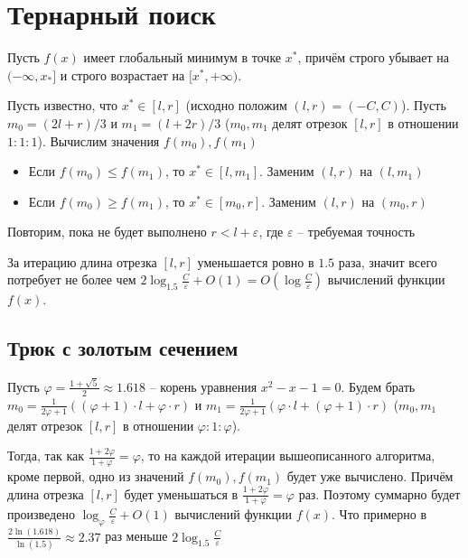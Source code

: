 \section{Тернарный поиск}

Пусть $f(x)$ имеет глобальный минимум в точке $x^*$,
причём строго убывает на $(-\infty, x_*]$ и строго возрастает на $[x^*, +\infty)$.

Пусть известно, что $x^* \in [l, r]$ (исходно положим $(l, r) =  (-C, C)$).
Пусть $m_0 = (2l + r) / 3$ и $m_1 = (l + 2r) / 3$ ($m_0, m_1$ делят отрезок $[l, r]$ в отношении $1:1:1$).
Вычислим значения $f(m_0), f(m_1)$
\begin{itemize}
    \item Если $f(m_0) \le f(m_1)$, то $x^* \in [l, m_1]$. Заменим $(l, r)$ на $(l, m_1)$
    \item Если $f(m_0) \ge f(m_1)$, то $x^* \in [m_0, r]$. Заменим $(l, r)$ на $(m_0, r)$
\end{itemize}
Повторим, пока не будет выполнено $r < l + \varepsilon$, где $\varepsilon$ -- требуемая точность

За итерацию длина отрезка $[l, r]$ уменьшается ровно в $1.5$ раза,
значит всего потребует не более чем $2 \log_{1.5} \frac{C}{\varepsilon} + O(1) = O(\log \frac{C}{\varepsilon})$ вычислений функции $f(x)$.


\subsection{Трюк с золотым сечением}

Пусть $\varphi = \frac{1 + \sqrt{5}}{2} \approx 1.618$ -- корень уравнения $x^2 - x - 1 = 0$.
Будем брать
$m_0 = \frac{1}{2\varphi + 1}\left((\varphi + 1) \cdot l + \varphi \cdot r \right)$
и
$m_1 = \frac{1}{2\varphi + 1}\left(\varphi \cdot l + (\varphi + 1) \cdot r \right)$
($m_0, m_1$ делят отрезок $[l, r]$ в отношении $ \varphi : 1 : \varphi$).

Тогда, так как $\frac{1 + 2\varphi}{1 + \varphi} = \varphi$, то на каждой итерации вышеописанного алгоритма, кроме первой,
одно из значений $f(m_0), f(m_1)$ будет уже вычислено.
Причём длина отрезка $[l, r]$ будет уменьшаться в $\frac{1 + 2\varphi}{1 + \varphi} = \varphi$ раз.
Поэтому суммарно будет произведено $\log_{\varphi} \frac{C}{\varepsilon} + O(1)$ вычислений функции $f(x)$.
Что примерно в $\frac{2\ln(1.618)}{\ln(1.5)} \approx 2.37$ раз меньше $2\log_{1.5} \frac{C}{\varepsilon}$